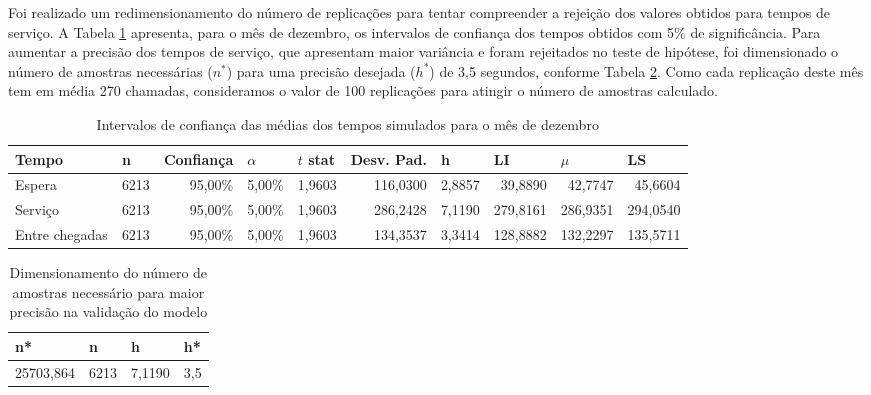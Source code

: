     
Foi realizado um redimensionamento do número de replicações para tentar compreender a rejeição dos valores obtidos para tempos de serviço. A Tabela \ref*{fig: intervalo-confianca} apresenta, para o mês de dezembro, os intervalos de confiança dos tempos obtidos com 5\% de significância. Para aumentar a precisão dos tempos de serviço, que apresentam maior variância e foram rejeitados no teste de hipótese, foi dimensionado o número de amostras necessárias ($n^*$) para uma precisão desejada ($h^*$) de 3,5 segundos, conforme Tabela \ref*{fig: dimensionamento-corridas}. Como cada replicação deste mês tem em média 270 chamadas, consideramos o valor de 100 replicações para atingir o número de amostras calculado.

\begin{table}[H]
    \begin{tabular}{|l|r|r|r|r|r|r|r|r|r|}
    \hline
    Tempo & \multicolumn{1}{l|}{n} & \multicolumn{1}{l|}{Confiança} & \multicolumn{1}{l|}{$\alpha$} & \multicolumn{1}{l|}{$t$ stat} & \multicolumn{1}{l|}{Desv. Pad.} & \multicolumn{1}{l|}{h} & \multicolumn{1}{l|}{LI} & \multicolumn{1}{l|}{$\mu$} & \multicolumn{1}{l|}{LS} \\ \hline
    Espera & 6213 & 95,00\% & 5,00\% & 1,9603 & 116,0300 & 2,8857 & 39,8890 & 42,7747 & 45,6604 \\ \hline
    Serviço & 6213 & 95,00\% & 5,00\% & 1,9603 & 286,2428 & 7,1190 & 279,8161 & 286,9351 & 294,0540 \\ \hline
    Entre chegadas & 6213 & 95,00\% & 5,00\% & 1,9603 & 134,3537 & 3,3414 & 128,8882 & 132,2297 & 135,5711 \\ \hline
    \end{tabular}
    \caption{Intervalos de confiança das médias dos tempos simulados para o mês de dezembro}
    \label{fig: intervalo-confianca}
\end{table}

\begin{table}[H]
    \centering
    \begin{tabular}{|l|l|l|l|}
    \hline
    n* & n & h & h* \\ \hline
    \multicolumn{1}{|r|}{25703,864} & \multicolumn{1}{r|}{6213} & \multicolumn{1}{r|}{7,1190} & \multicolumn{1}{r|}{3,5} \\ \hline
    \end{tabular}
    \caption{Dimensionamento do número de amostras necessário para maior precisão na validação do modelo}
    \label{fig: dimensionamento-corridas}
\end{table}
    
